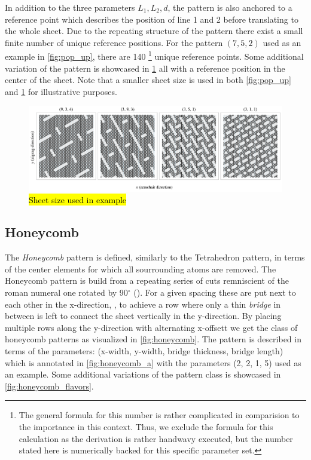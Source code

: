 In addition to the three parameters $L_1, L_2, d$, the pattern is also anchored to a reference point which describes the position of line 1 and 2 before translating to the whole sheet. Due to the repeating structure of the pattern there exist a small finite number of unique reference positions. For the pattern $(7, 5, 2)$ used as an example in \cref{fig:pop_up}, there are 140 \footnote{The general formula for this number is rather complicated in comparision to the importance in this context. Thus, we exclude the formula for this calculation as the derivation is rather handwavy executed, but the number stated here is numerically backed for this specific parameter set.} unique reference points. Some additional variation of the pattern is showcased in \cref{fig:pop_up_flavors} all with a reference position in the center of the sheet. Note that a smaller sheet size is used in both \cref{fig:pop_up} and \cref{fig:pop_up_flavors} for illustrative purposes.

\begin{figure}[H]
  \centering
  \includegraphics[width=\linewidth]{figures/system/pop_up_flavors.pdf}
  \caption{\hl{Sheet size used in example}}
  \label{fig:pop_up_flavors}
\end{figure}



\subsection{Honeycomb}
The \textit{Honeycomb} pattern is defined, similarly to the Tetrahedron pattern,
in terms of the center elements for which all sourrounding atoms are removed. The Honeycomb pattern is build from a repeating series of
cuts remniscient of the roman numeral one rotated by 90$^{\circ}$
(). For a given spacing these are put next to each other in the x-direction, 
, to achieve a row
where only a thin \textit{bridge} in between is left to connect the sheet vertically in the y-direction. By placing multiple rows along the y-direction with alternating x-offsett we get the class of honeycomb patterns as visualized in \cref{fig:honeycomb}. The pattern
is described in terms of the parameters: (x-width, y-width, bridge thickness,
bridge length) which is annotated in \cref{fig:honeycomb_a} with the parameters (2, 2, 1, 5) used as an example. Some additional variations of the pattern class is showcased in \cref{fig:honeycomb_flavors}.


